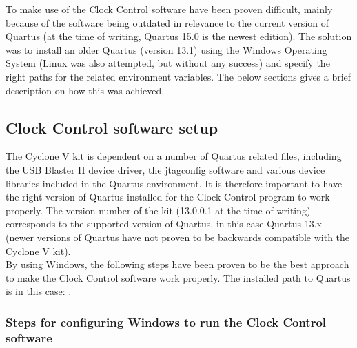 \documentclass[main.tex]{subfiles}
\begin{document}
To make use of the Clock Control software have been proven difficult, mainly because of the software being outdated in relevance to the current version of Quartus (at the time of writing, Quartus 15.0 is the newest edition). The solution was to install an older Quartus (version 13.1) using the Windows Operating System (Linux was also attempted, but without any success) and specify the right paths for the related environment variables. The below sections gives a brief description on how this was achieved.\\

\subsection{Clock Control software setup}

The Cyclone V kit is dependent on a number of Quartus related files, including the USB Blaster II device driver, the jtagconfig software and various device libraries included in the Quartus environment. It is therefore important to have the right version of Quartus installed for the Clock Control program to work properly. The version number of the kit (13.0.0.1 at the time of writing) corresponds to the supported version of Quartus, in this case Quartus 13.x (newer versions of Quartus have not proven to be backwards compatible with the Cyclone V kit).\\

By using Windows, the following steps have been proven to be the best approach to make the Clock Control software work properly. The installed path to Quartus is in this case: .\\

\subsubsection{Steps for configuring Windows to run the Clock Control software}
\end{document}
